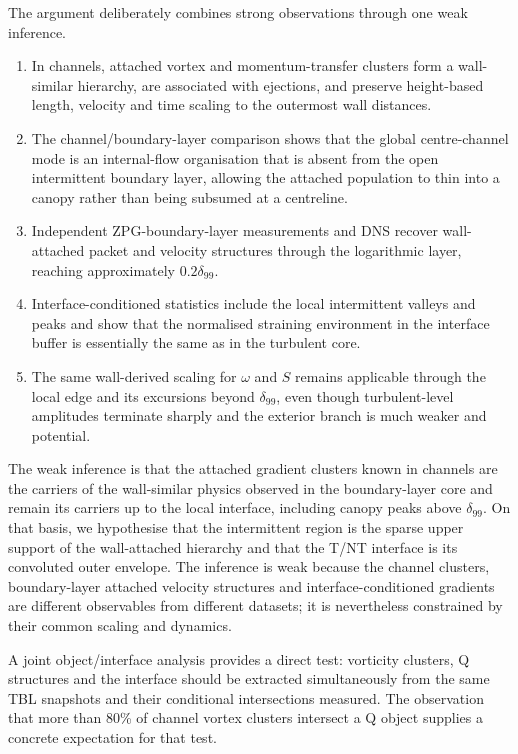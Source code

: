 \documentclass[11pt]{article}
\begin{document}
The argument deliberately combines strong observations through one weak inference.
\begin{enumerate}
 \item In channels, attached vortex and momentum-transfer clusters form a wall-similar hierarchy, are associated with ejections, and preserve height-based length, velocity and time scaling to the outermost wall distances.
 \item The channel/boundary-layer comparison shows that the global centre-channel mode is an internal-flow organisation that is absent from the open intermittent boundary layer, allowing the attached population to thin into a canopy rather than being subsumed at a centreline.
 \item Independent ZPG-boundary-layer measurements and DNS recover wall-attached packet and velocity structures through the logarithmic layer, reaching approximately $0.2\delta_{99}$.
 \item Interface-conditioned statistics include the local intermittent valleys and peaks and show that the normalised straining environment in the interface buffer is essentially the same as in the turbulent core.
 \item The same wall-derived scaling for $\omega$ and $S$ remains applicable through the local edge and its excursions beyond $\delta_{99}$, even though turbulent-level amplitudes terminate sharply and the exterior branch is much weaker and potential.
\end{enumerate}
The weak inference is that the attached gradient clusters known in channels are the carriers of the wall-similar physics observed in the boundary-layer core and remain its carriers up to the local interface, including canopy peaks above $\delta_{99}$. On that basis, we hypothesise that the intermittent region is the sparse upper support of the wall-attached hierarchy and that the T/NT interface is its convoluted outer envelope. The inference is weak because the channel clusters, boundary-layer attached velocity structures and interface-conditioned gradients are different observables from different datasets; it is nevertheless constrained by their common scaling and dynamics.

A joint object/interface analysis provides a direct test: vorticity clusters, Q structures and the interface should be extracted simultaneously from the same TBL snapshots and their conditional intersections measured. The observation that more than 80\% of channel vortex clusters intersect a Q object supplies a concrete expectation for that test.
\end{document}

